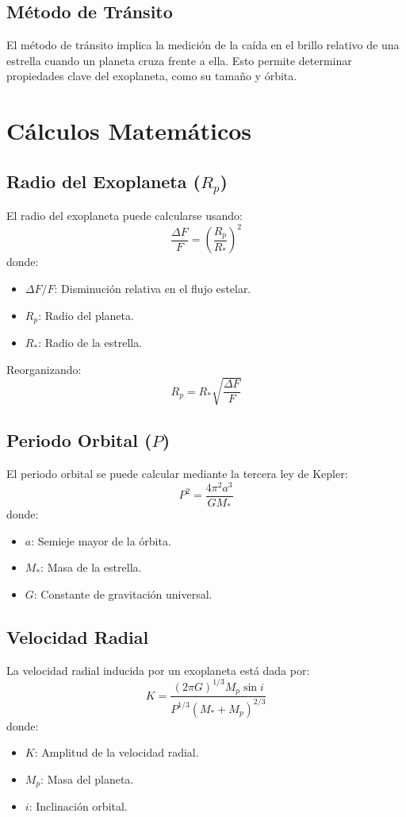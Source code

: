 \documentclass[12pt]{article}
\begin{document}
\subsection{Método de Tránsito}
El método de tránsito implica la medición de la caída en el brillo relativo de una estrella cuando un planeta cruza frente a ella. Esto permite determinar propiedades clave del exoplaneta, como su tamaño y órbita.

\section{Cálculos Matemáticos}
\subsection{Radio del Exoplaneta (\( R_p \))}
El radio del exoplaneta puede calcularse usando:
\[
\frac{\Delta F}{F} = \left(\frac{R_p}{R_*}\right)^2
\]
donde:
\begin{itemize}
    \item \( \Delta F / F \): Disminución relativa en el flujo estelar.
    \item \( R_p \): Radio del planeta.
    \item \( R_* \): Radio de la estrella.
\end{itemize}
Reorganizando:
\[
R_p = R_* \sqrt{\frac{\Delta F}{F}}
\]

\subsection{Periodo Orbital (\( P \))}
El periodo orbital se puede calcular mediante la tercera ley de Kepler:
\[
P^2 = \frac{4\pi^2 a^3}{G M_*}
\]
donde:
\begin{itemize}
    \item \( a \): Semieje mayor de la órbita.
    \item \( M_* \): Masa de la estrella.
    \item \( G \): Constante de gravitación universal.
\end{itemize}

\subsection{Velocidad Radial}
La velocidad radial inducida por un exoplaneta está dada por:
\[
K = \frac{(2 \pi G)^{1/3} M_p \sin i}{P^{1/3} (M_* + M_p)^{2/3}}
\]
donde:
\begin{itemize}
    \item \( K \): Amplitud de la velocidad radial.
    \item \( M_p \): Masa del planeta.
    \item \( i \): Inclinación orbital.
\end{itemize}
\end{document}
